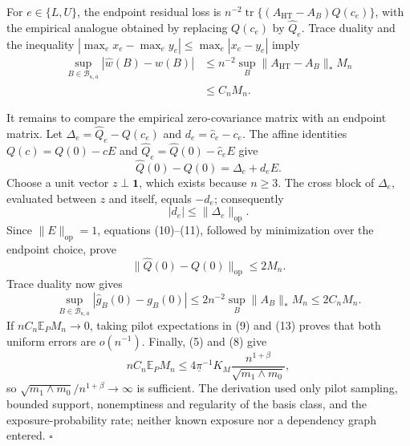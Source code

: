 For \(e\in\{L,U\}\), the endpoint residual loss is \(n^{-2}\operatorname{tr}\{(A_{\mathrm{HT}}-A_B)Q(c_e)\}\), with the empirical analogue obtained by replacing \(Q(c_e)\) by \(\widehat Q_e\).  Trace duality and the inequality \(|\max_e x_e-\max_e y_e|\le\max_e|x_e-y_e|\) imply
\[
\begin{aligned}
\sup_{B\in\mathcal B_{\kappa,\overline a}}
|\widehat w(B)-w(B)|
&\le n^{-2}\sup_B
\lVert A_{\mathrm{HT}}-A_B\rVert_*M_n\\
&\le C_nM_n.
\end{aligned}
\tag{9}
\]

It remains to compare the empirical zero-covariance matrix with an endpoint matrix.  Let \(\Delta_e=\widehat Q_e-Q(c_e)\) and \(d_e=\widehat c_e-c_e\).  The affine identities \(Q(c)=Q(0)-cE\) and \(\widehat Q_e=\widehat Q(0)-\widehat c_eE\) give
\[
\widehat Q(0)-Q(0)=\Delta_e+d_eE.
\tag{10}
\]
Choose a unit vector \(z\perp\mathbf1\), which exists because \(n\ge3\).  The cross block of \(\Delta_e\), evaluated between \(z\) and itself, equals \(-d_e\); consequently
\[
|d_e|\le\lVert\Delta_e\rVert_{\mathrm{op}}.
\tag{11}
\]
Since \(\lVert E\rVert_{\mathrm{op}}=1\), equations (10)--(11), followed by minimization over the endpoint choice, prove
\[
\lVert\widehat Q(0)-Q(0)\rVert_{\mathrm{op}}\le2M_n.
\tag{12}
\]
Trace duality now gives
\[
\sup_{B\in\mathcal B_{\kappa,\overline a}}
|\widehat g_B(0)-g_B(0)|
\le2n^{-2}\sup_B\lVert A_B\rVert_*M_n
\le2C_nM_n.
\tag{13}
\]
If \(nC_n\mathbb E_PM_n\to0\), taking pilot expectations in (9) and (13) proves that both uniform errors are \(o(n^{-1})\).  Finally, (5) and (8) give
\[
nC_n\mathbb E_PM_n
\le4\underline\pi^{-1}K_M
\frac{n^{1+\beta}}{\sqrt{m_1\wedge m_0}},
\tag{14}
\]
so \(\sqrt{m_1\wedge m_0}/n^{1+\beta}\to\infty\) is sufficient.  The derivation used only pilot sampling, bounded support, nonemptiness and regularity of the basis class, and the exposure-probability rate; neither known exposure nor a dependency graph entered. \(\square\)